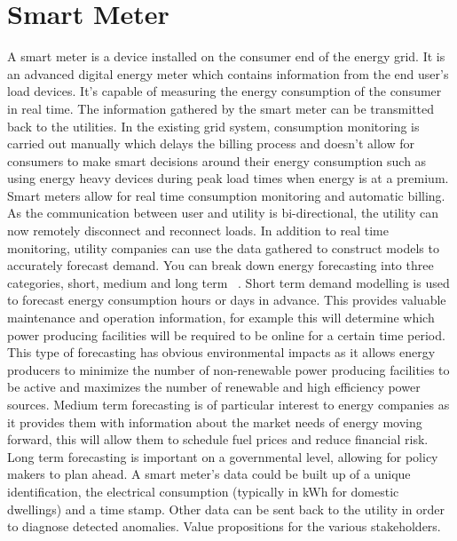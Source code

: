 \section{Smart Meter}
A smart meter is a device installed on the consumer end of the energy grid. It is an advanced digital energy meter which contains information from the end user's load devices. It's capable of measuring the energy consumption of the consumer in real time. The information gathered by the smart meter can be transmitted back to the utilities. In the existing grid system, consumption monitoring is carried out manually which delays the billing process and doesn't allow for consumers to make smart decisions around their energy consumption such as using energy heavy devices during peak load times when energy is at a premium. Smart meters allow for real time consumption monitoring and automatic billing. As the communication between user and utility is bi-directional, the utility can now remotely disconnect and reconnect loads. In addition to real time monitoring, utility companies can use the data gathered to construct models to accurately forecast demand.  You can break down energy forecasting into three categories, short, medium and long term ~\cite{1717600}. Short term demand modelling is used to forecast energy consumption hours or days in advance. This provides valuable maintenance and operation information, for example this will determine which power producing facilities will be required to be online for a certain time period. This type of forecasting has obvious environmental impacts as it allows energy producers to minimize the number of non-renewable power producing facilities to be active and maximizes the number of renewable and high efficiency power sources. Medium term forecasting is of particular interest to energy companies as it provides them with information about the market needs of energy moving forward, this will allow them to schedule fuel prices and reduce financial risk. Long term forecasting is important on a governmental level, allowing for policy makers to plan ahead. A smart meter's data could be built up of a unique identification, the electrical consumption (typically in kWh for domestic dwellings) and a time stamp. Other data can be sent back to the utility in order to diagnose detected anomalies. Value propositions for the various stakeholders. 
